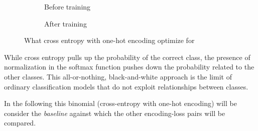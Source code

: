 \begin{figure}[htbp]
  \centering
  \begin{subfigure}{0.45\textwidth}
    \centering
    \begin{minipage}{\textwidth}
      \resizebox{\linewidth}{!}{}
    \end{minipage}
    \caption{Before training}
    \label{fig:03/xe-onehot-before}
  \end{subfigure}
  \begin{subfigure}{0.45\textwidth}
    \centering
    \begin{minipage}{\textwidth}
      \resizebox{\linewidth}{!}{}
    \end{minipage}
    \caption{After training}
    \label{fig:03/xe-onehot-after}
  \end{subfigure}
  \caption{What cross entropy with one-hot encoding optimize for}
\end{figure}

While cross entropy pulls up the probability of the correct class, the presence of normalization in the softmax function pushes down the probability related to the other classes. This all-or-nothing, black-and-white approach is the limit of ordinary classification models that do not exploit relationships between classes.

In the following this binomial (cross-entropy with one-hot encoding) will be consider the \emph{baseline} against which the other encoding-loss pairs will be compared.

